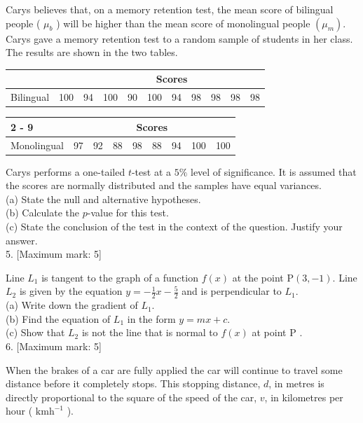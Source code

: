 \documentclass[10pt]{article}
\begin{document}
Carys believes that, on a memory retention test, the mean score of bilingual people ( $\mu_{b}$ ) will be higher than the mean score of monolingual people $\left(\mu_{m}\right)$. Carys gave a memory retention test to a random sample of students in her class. The results are shown in the two tables.

\begin{center}
\begin{tabular}{|l|c|c|c|c|c|c|c|c|c|c|}
\multicolumn{1}{c}{} & \multicolumn{1}{|c|}{} & \multicolumn{9}{c|}{Scores} \\
\hline
Bilingual & 100 & 94 & 100 & 90 & 100 & 94 & 98 & 98 & 98 & 98 \\
\hline
\end{tabular}
\end{center}

\begin{center}
\begin{tabular}{|l|c|c|c|c|c|c|c|c|}
\cline { 2 - 9 }
\multicolumn{1}{c|}{} & \multicolumn{9}{|c|}{Scores} \\
\hline
Monolingual & 97 & 92 & 88 & 98 & 88 & 94 & 100 & 100 &  \\
\hline
\end{tabular}
\end{center}

Carys performs a one-tailed $t$-test at a $5 \%$ level of significance. It is assumed that the scores are normally distributed and the samples have equal variances.\\
(a) State the null and alternative hypotheses.\\
(b) Calculate the $p$-value for this test.\\
(c) State the conclusion of the test in the context of the question. Justify your answer.\\[0pt]
5. [Maximum mark: 5]

Line $L_{1}$ is tangent to the graph of a function $f(x)$ at the point $\mathrm{P}(3,-1)$. Line $L_{2}$ is given by the equation $y=-\frac{1}{2} x-\frac{5}{2}$ and is perpendicular to $L_{1}$.\\
(a) Write down the gradient of $L_{1}$.\\
(b) Find the equation of $L_{1}$ in the form $y=m x+c$.\\
(c) Show that $L_{2}$ is not the line that is normal to $f(x)$ at point P .\\[0pt]
6. [Maximum mark: 5]

When the brakes of a car are fully applied the car will continue to travel some distance before it completely stops. This stopping distance, $d$, in metres is directly proportional to the square of the speed of the car, $v$, in kilometres per hour ( $\mathrm{km} \mathrm{h}^{-1}$ ).
\end{document}
